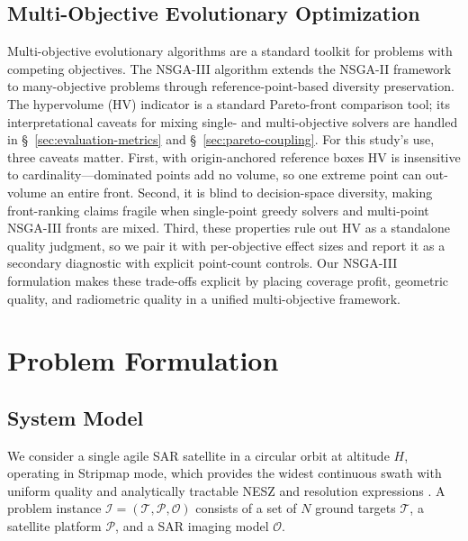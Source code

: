 \documentclass[preprint,12pt,authoryear]{elsarticle}
\begin{document}
\subsection{Multi-Objective Evolutionary Optimization}
Multi-objective evolutionary algorithms are a standard toolkit
for problems with competing objectives. The NSGA-III algorithm
\citep{Deb2014} extends the NSGA-II framework \citep{Deb2002NSGA2} to many-objective problems
through reference-point-based diversity preservation.
The hypervolume (HV) indicator \citep{Zitzler1999HV} is a standard
Pareto-front comparison tool; its interpretational caveats for mixing
single- and multi-objective solvers are handled in
\S~\ref{sec:evaluation-metrics} and \S~\ref{sec:pareto-coupling}.
For this study's use, three caveats matter. First, with origin-anchored reference boxes
HV is insensitive to cardinality---dominated points add no volume, so one extreme point
can out-volume an entire front. Second, it is blind to decision-space diversity, making
front-ranking claims fragile when single-point greedy solvers and multi-point NSGA-III
fronts are mixed. Third, these properties rule out HV as a standalone quality judgment,
so we pair it with per-objective effect sizes and report it as a secondary diagnostic
with explicit point-count controls.
Our NSGA-III formulation makes these trade-offs explicit by placing
coverage profit, geometric quality, and radiometric quality in a unified
multi-objective framework.
\section{Problem Formulation}
\subsection{System Model}\label{sec:system-model}
We consider a single agile SAR satellite in a circular orbit at altitude $H$,
operating in Stripmap mode, which provides the widest continuous swath with
uniform quality and analytically tractable NESZ and resolution expressions
\citep{Curlander1991}.
A problem instance $\mathcal{I} = (\mathcal{T}, \mathcal{P}, \mathcal{O})$ consists of
a set of $N$ ground targets $\mathcal{T}$, a satellite platform $\mathcal{P}$,
and a SAR imaging model $\mathcal{O}$.
\end{document}
